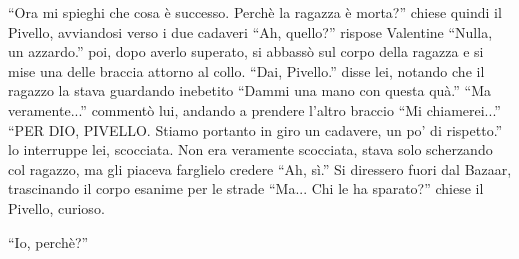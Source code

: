     ``Ora mi spieghi che cosa è successo. Perchè la ragazza è morta?'' chiese quindi il Pivello, avviandosi verso i due
    cadaveri ``Ah, quello?'' rispose Valentine ``Nulla, un azzardo.'' poi, dopo averlo superato, si abbassò sul corpo
    della ragazza e si mise una delle braccia attorno al collo. ``Dai, Pivello.'' disse lei, notando che il ragazzo la
    stava guardando inebetito ``Dammi una mano con questa quà.'' ``Ma veramente...'' commentò lui, andando a prendere
    l'altro braccio ``Mi chiamerei...'' ``PER DIO, PIVELLO. Stiamo portanto in giro un cadavere, un po' di rispetto.''
    lo interruppe lei, scocciata. Non era veramente scocciata, stava solo scherzando col ragazzo, ma gli piaceva
    farglielo credere ``Ah, sì.'' Si diressero fuori dal Bazaar, trascinando il corpo esanime per le strade ``Ma... Chi
    le ha sparato?'' chiese il Pivello, curioso.

    ``Io, perchè?''
